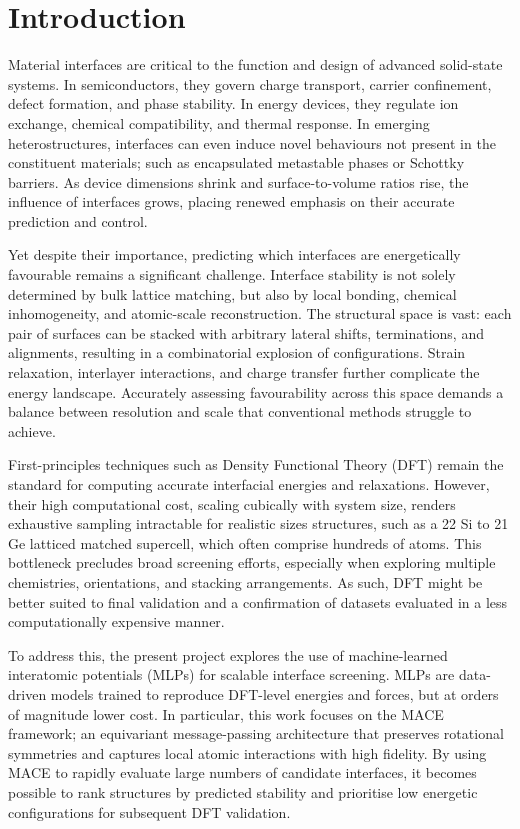 \chapter{Introduction} \label{chapter:introduction}

Material interfaces are critical to the function and design of advanced solid-state systems. In semiconductors, they govern charge transport, carrier confinement, defect formation, and phase stability. In energy devices, they regulate ion exchange, chemical compatibility, and thermal response. In emerging heterostructures, interfaces can even induce novel behaviours not present in the constituent materials; such as encapsulated metastable phases or Schottky barriers. As device dimensions shrink and surface-to-volume ratios rise, the influence of interfaces grows, placing renewed emphasis on their accurate prediction and control.

Yet despite their importance, predicting which interfaces are energetically favourable remains a significant challenge. Interface stability is not solely determined by bulk lattice matching, but also by local bonding, chemical inhomogeneity, and atomic-scale reconstruction. The structural space is vast: each pair of surfaces can be stacked with arbitrary lateral shifts, terminations, and alignments, resulting in a combinatorial explosion of configurations. Strain relaxation, interlayer interactions, and charge transfer further complicate the energy landscape. Accurately assessing favourability across this space demands a balance between resolution and scale that conventional methods struggle to achieve.

First-principles techniques such as Density Functional Theory (DFT) remain the standard for computing accurate interfacial energies and relaxations. However, their high computational cost, scaling cubically with system size, renders exhaustive sampling intractable for realistic sizes structures, such as a 22 \times Si to 21 \times Ge latticed matched supercell, which often comprise hundreds of atoms. This bottleneck precludes broad screening efforts, especially when exploring multiple chemistries, orientations, and stacking arrangements. As such, DFT might be better suited to final validation and a confirmation of datasets evaluated in a less computationally expensive manner.

To address this, the present project explores the use of machine-learned interatomic potentials (MLPs) for scalable interface screening. MLPs are data-driven models trained to reproduce DFT-level energies and forces, but at orders of magnitude lower cost. In particular, this work focuses on the MACE framework; an equivariant message-passing architecture that preserves rotational symmetries and captures local atomic interactions with high fidelity. By using MACE to rapidly evaluate large numbers of candidate interfaces, it becomes possible to rank structures by predicted stability and prioritise low energetic configurations for subsequent DFT validation.

